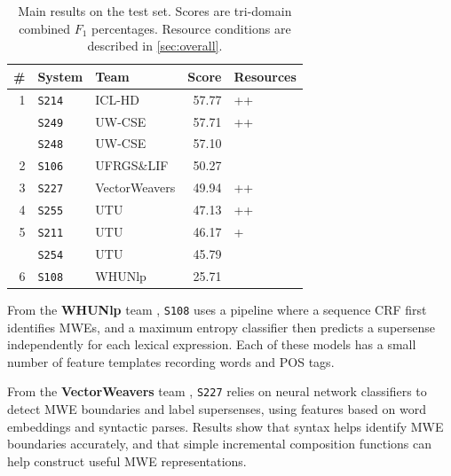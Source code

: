\documentclass[11pt,letterpaper]{article}
\newcommand{\sys}[1]{\mbox{\texttt{#1}}}   %
\begin{document}
\begin{table}\small\centering
\begin{tabular}{rllrl}
 \#   & \textbf{System} &           \textbf{Team} &  \textbf{Score}  & \textbf{Resources} \\
\midrule
    1 &   \sys{S214} &         ICL-HD &  57.77 &   ++ \\
      &   \sys{S249} &         UW-CSE &  57.71 &   ++ \\
      &   \sys{S248} &         UW-CSE &  57.10 &      \\
    2 &   \sys{S106} &     UFRGS\&LIF &  50.27 &      \\
    3 &   \sys{S227} &  VectorWeavers &  49.94 &   ++ \\
    4 &   \sys{S255} &            UTU &  47.13 &   ++ \\
    5 &   \sys{S211} &            UTU &  46.17 &    + \\
      &   \sys{S254} &            UTU &  45.79 &      \\
    6 &   \sys{S108} &         WHUNlp &  25.71 &      \\
\end{tabular}

\caption{Main results on the test set. Scores are tri-domain combined $F_1$ percentages. 
Resource conditions are described in \cref{sec:overall}.}

\label{tbl:main-results}
	
\end{table}


From the \textbf{WHUNlp} team \citep{dimsum-16-whunlp},
\sys{S108} uses a pipeline where a sequence CRF first identifies MWEs, 
and a maximum entropy classifier then predicts a supersense independently 
for each lexical expression. Each of these models has a small number of feature templates 
recording words and POS tags.

From the \textbf{VectorWeavers} team \citep{dimsum-16-vector},
\sys{S227} relies on neural network classifiers to detect MWE boundaries and label supersenses, 
using features based on word embeddings and syntactic parses. 
Results show that syntax helps identify MWE boundaries accurately, and that 
simple incremental composition functions can help construct useful MWE representations.
\end{document}
